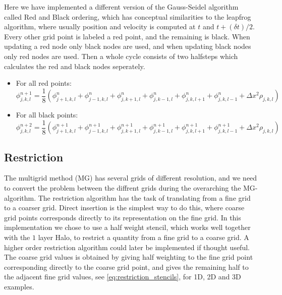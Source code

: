     	Here we have implemented a different version of the Gauss-Seidel algorithm called Red and Black ordering, which has conceptual similarities
    	to the leapfrog algorithm, where usually position and velocity is computed at \(t\) and \( t+(\delta t)/2 \). Every other grid point is labeled a
    	red point, and the remaining is black. When updating a red node only black nodes are used, and when updating black nodes only
    	red nodes are used. Then a whole cycle consists of two halfsteps which calculates the red and black nodes seperately.

    	\begin{itemize}
    		\item For all red points:
    			\[\phi^{n+1}_{j,k,l} = \frac{1}{8} \left( \phi^{n}_{j+1,k,l} +\phi^{n}_{j-1,k,l} + \phi^n_{j,k+1,l} + \phi^{n}_{j,k-1,l} +
    	 							\phi^n_{j,k,l+1} + \phi^{n}_{j,k,l-1} + \Delta x^2 \rho_{j,k,l} \right)
    			\]
    		\item For all black points:
    		\[\phi^{n+2}_{j,k,l} = \frac{1}{8} \left( \phi^{n+1}_{j+1,k,l} +\phi^{n+1}_{j-1,k,l} + \phi^{n+1}_{j,k+1,l} + \phi^{n+1}_{j,k-1,l} +
    							\phi^{n+1}_{j,k,l+1} + \phi^{n+1}_{j,k,l-1} + \Delta x^2 \rho_{j,k,l} \right)
    		\]
    	\end{itemize}

        \subsection{Restriction}
        	\label{sec:restr_simple}
        	The multigrid method (MG) has several grids of different resolution, and we need to
         	convert the problem between the diffrent grids during the overarching the MG-algorithm.
         	The restriction algorithm has the task of translating from a fine grid to a coarser grid.
			Direct insertion is the simplest way to do this, where coarse grid points
			corresponds directly to its representation on the fine grid.
        	In this implementation we chose to use a half weight stencil, which works well together
			with the \(1\) layer Halo, to restrict a quantity from a fine
        	grid to a coarse grid. A higher order restriction algorithm could later
			be implemented if thought useful. The coarse grid values is obtained by giving half weighting to
        	the fine grid point corresponding directly to the coarse grid point, and gives the remaining
        	half to the adjacent fine grid values, see \eqref{eq:restriction_stencils}, for 1D,
        	2D and 3D examples.

